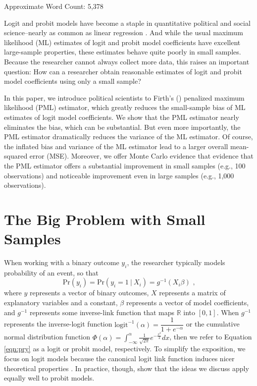 \documentclass[12pt]{article}
\begin{document}
 \vspace{5mm}
 \begin{center}
 Approximate Word Count: 5,378
 \end{center}

\thispagestyle{empty}

\newpage
\doublespace


Logit and probit models have become a staple in quantitative political and social science--nearly as common as linear regression \citep{KruegerLewisBeck2008}. 
And while the usual maximum likelihood (ML) estimates of logit and probit model coefficients have excellent large-sample properties, these estimates behave quite poorly in small samples. 
Because the researcher cannot always collect more data, this raises an important question: How can a researcher obtain reasonable estimates of logit and probit model coefficients using only a small sample?

In this paper, we introduce political scientists to Firth's (\citeyear{Firth1993}) penalized maximum likelihood (PML) estimator, which greatly reduces the small-sample bias of ML estimates of logit model coefficients. 
We show that the PML estimator nearly eliminates the bias, which can be substantial. 
But even more importantly, the PML estimator dramatically reduces the variance of the ML estimator. 
Of course, the inflated bias and variance of the ML estimator lead to a larger overall mean-squared error (MSE). 
Moreover, we offer Monte Carlo evidence that evidence that the PML estimator offers a substantial improvement in small samples (e.g., 100 observations) and noticeable improvement even in large samples (e.g., 1,000 observations).

\section*{The Big Problem with Small Samples}

When working with a binary outcome $y_i$, the researcher typically models probability of an event, so that
\begin{equation}\label{eqn:pry}
\text{Pr}(y_i) = \text{Pr}(y_i = 1~|~ X_i) =  g^{-1}(X_i\beta)\text{ ,}
\end{equation}
where $y$ represents a vector of binary outcomes, $X$ represents a matrix of explanatory variables and a constant, $\beta$ represents a vector of model coefficients, and $g^{-1}$ represents some inverse-link function that maps $\mathbb{R}$ into $[0, 1]$. 
When $g^{-1}$ represents the inverse-logit function $\text{logit}^{-1}(\alpha) = \dfrac{1}{1 + e^{-\alpha}}$ or the cumulative normal distribution function $\Phi(\alpha) = \int_{-\infty}^\alpha \frac{1}{\sqrt{2\pi}}e^{-\frac{x^2}{2}}dx$, then we refer to Equation \ref{eqn:pry} as a logit or probit model, respectively.
To simplify the exposition, we focus on logit models because the canonical logit link function induces nicer theoretical properties \citep[pp. 31-32]{McCullaghNelder1989}. 
In practice, though, \cite{KosmidisFirth2009} show that the ideas we discuss apply equally well to probit models.
\end{document}
